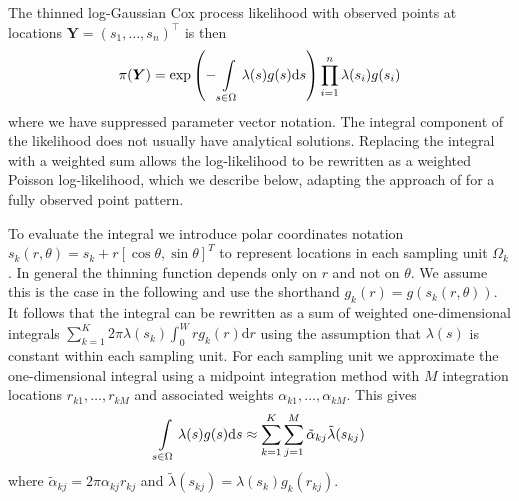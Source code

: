 \documentclass[preprint,12pt]{elsarticle}
\newcommand{\bm}{\boldsymbol}  %
\newcommand{\tl}{\tilde{\lambda}}   %
\begin{document}
The thinned log-Gaussian Cox process likelihood with observed points at locations $\bm{Y} = (s_1, \ldots, s_n)^\intercal$ is then
\begin{equation}
\label{lgcp-likelihood}
\pi(\bm{Y}) = \exp\left(-\int\displaylimits_{s \in \Omega} \lambda(s) g(s) \mathrm{d}s \right)\prod_{i=1}^n \lambda(s_i)g(s_i)
\end{equation}
where we have suppressed parameter vector notation.  The integral component of the likelihood does not usually have analytical solutions.  Replacing the integral with a weighted sum allows the log-likelihood to be rewritten as a weighted Poisson log-likelihood, which we describe below, adapting the approach of \cite{simpson_going_2016} for a fully observed point pattern.

To evaluate the integral we introduce polar coordinates notation $s_k(r, \theta) = s_k + r\left[\cos\theta, \sin\theta \right]^T$ to represent locations in each sampling unit $\Omega_k$.   In general the thinning function depends only on $r$ and not on $\theta$.  We assume this is the case in the following and use the shorthand $g_k(r) = g(s_k(r, \theta))$. It follows that the integral can be rewritten as a sum of weighted one-dimensional integrals $\sum_{k=1}^K 2\pi \lambda(s_k) \int_0^W r g_k(r)\mathrm{d}r$ using the assumption that $\lambda(s)$ is constant within each sampling unit.  For each sampling unit we approximate the one-dimensional integral using a midpoint integration method with $M$ integration locations $r_{k1}, \ldots, r_{kM}$ and associated weights $\alpha_{k1}, \ldots, \alpha_{kM}$.  This gives
\begin{equation*}
	\int\displaylimits_{s \in \Omega} \lambda(s)g(s)\mathrm{d}s \approx \sum_{k=1}^K \sum_{j=1}^M \tilde{\alpha}_{kj} \tl(s_{kj})
\end{equation*}
where $\tilde{\alpha}_{kj} = 2\pi \alpha_{kj}r_{kj}$ and $\tl(s_{kj}) = \lambda(s_k) g_k(r_{kj})$.
\end{document}
